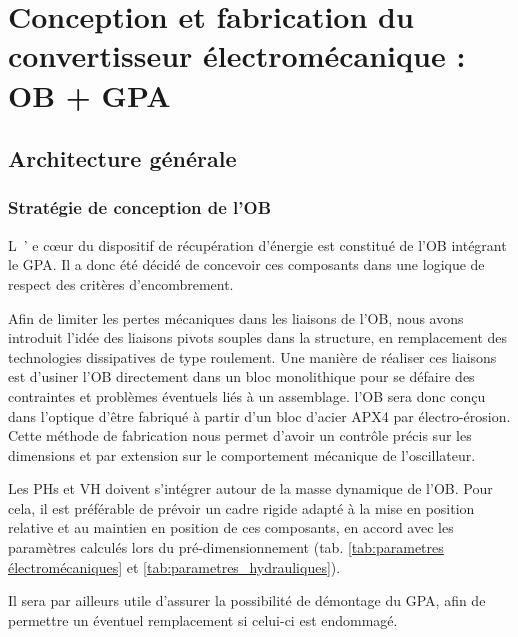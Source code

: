 \chapter{Conception et fabrication du convertisseur électromécanique : OB + GPA}
\label{ch:3_Conception et fabrication du convertisseur electromecanique : OB + GPA}
\minitoc
\newpage

\section{Architecture générale}
\label{sec:3.1:Architecture generale}
	\subsection{Stratégie de conception de l'OB}
	\label{subsec:3.1.1:Strategie de conception de l'OB}
\lettrine[lines=1]{L~'}{} e c\oe{}ur du dispositif de récupération d'énergie est constitué de l'OB intégrant le GPA. Il a donc été décidé de concevoir ces composants dans une logique de respect des critères d'encombrement. 

Afin de limiter les pertes mécaniques dans les liaisons de l'OB, nous avons introduit l'idée des liaisons pivots souples dans la structure, en remplacement des technologies dissipatives de type roulement. Une manière de réaliser ces liaisons est d'usiner l'OB directement dans un bloc monolithique pour se défaire des contraintes et problèmes éventuels liés à un assemblage. l'OB sera donc conçu dans l'optique d'être fabriqué à partir d'un bloc d'acier APX4 par électro-érosion. Cette méthode de fabrication nous permet d'avoir un contrôle précis sur les dimensions et par extension sur le comportement mécanique de l'oscillateur.

Les PHs et VH doivent s'intégrer autour de la masse dynamique de l'OB. Pour cela, il est préférable de prévoir un cadre rigide adapté à la mise en position relative et au maintien en position de ces composants, en accord avec les paramètres calculés lors du pré-dimensionnement (tab. \ref{tab:parametres électromécaniques} et \ref{tab:parametres_hydrauliques}).

Il sera par ailleurs utile d'assurer la possibilité de démontage du GPA, afin de permettre un éventuel remplacement si celui-ci est endommagé.		
